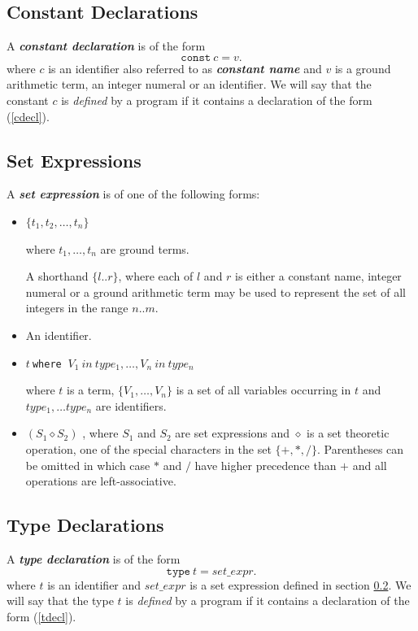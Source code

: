 \documentclass[a4paper,10pt]{article}
\begin{document}
\subsection{Constant Declarations}\label{cd}
A \textit{\textbf{constant declaration}} is of the form 
\begin{equation}\label{cdecl}
\texttt{const} ~c = v.
\end{equation}
where  $c$ is an identifier also referred to as  
\textbf{\textit{constant name}}  and $v$ is a ground arithmetic term, an integer numeral  or an identifier.
We will say that the constant $c$ is \textit{defined} by a program if it contains a declaration of the form (\ref{cdecl}).
\subsection{Set Expressions}\label{sexpr}

A \textbf{\textit{set expression}}  is of one of the following forms:
\begin{itemize}
\item $\{t_1,t_2, \ldots, t_n\}$

 where $t_1,\ldots,t_n$ are ground terms. 

A shorthand $\{l..r\}$, where each of $l$ and $r$ is either a constant name, integer numeral or a ground arithmetic term may be used to represent the  set of all integers in the range $n..m$.

\item An identifier.

\item $t~$\texttt{where} $~V_1~in~type_1,\ldots, V_n~in~type_n$
 
where $t$ is a term, $\{V_1, \ldots, V_n\}$ is a set of all variables occurring in $t$ and $type_1, \ldots type_n$ are identifiers.

\item $(S_1 \diamond S_2)$ , where $S_1$ and $S_2$ are set expressions and $\diamond$ is a set theoretic operation, one of the special characters in the set $\{+,*,/\}$. Parentheses can be omitted in which case $*$ and $/$ have higher precedence than $+$ and all operations are left-associative.
\end{itemize}

\subsection{Type Declarations}
A \textit{\textbf{type declaration}} is of the form 
\begin{equation}\label{tdecl}
\texttt{type}~t = set\_expr.
\end{equation}
where $t$ is an identifier and $set\_expr$ is a set expression defined in section \ref{sexpr}.
We will say that the type $t$ is \textit{defined} by a program if it contains a declaration of the form (\ref{tdecl}). 
 
\end{document}
